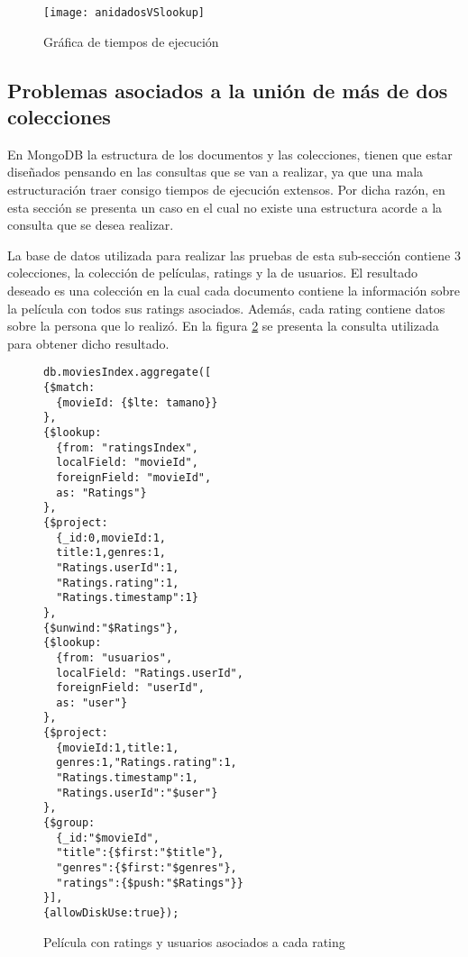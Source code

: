\documentclass[conference,compsoc]{sty/IEEEtran}
\begin{document}
\begin{figure}
\begin{center}
\texttt{[image: anidadosVSlookup]}
\end{center}
\caption{Gráfica de tiempos de ejecución} 
\label{fig:anidados-lookup}
\end{figure}

\subsection{Problemas asociados a la unión de más de dos colecciones}
 En MongoDB la estructura de los documentos y las colecciones, tienen que estar diseñados pensando en las consultas que se van a realizar, ya que una mala estructuración  traer consigo tiempos de ejecución extensos. Por dicha razón, en esta sección se presenta un caso en el cual no existe una estructura acorde a la consulta que se desea realizar. \par

La base de datos utilizada para realizar las pruebas de esta sub-sección contiene 3 colecciones, la colección de películas, ratings y la de usuarios. El resultado deseado es una colección en la cual cada documento contiene la información sobre la película con todos sus ratings asociados. Además, cada rating contiene datos sobre la persona que lo realizó. En la figura \ref{fig:consulta-doubleJoin} se presenta la consulta utilizada para obtener dicho resultado. 

\begin{figure}
    \begin{verbatim}
db.moviesIndex.aggregate([
{$match: 
  {movieId: {$lte: tamano}}
},
{$lookup: 
  {from: "ratingsIndex",
  localField: "movieId",
  foreignField: "movieId",
  as: "Ratings"}
},
{$project:
  {_id:0,movieId:1,
  title:1,genres:1,
  "Ratings.userId":1,
  "Ratings.rating":1,
  "Ratings.timestamp":1}
},
{$unwind:"$Ratings"},
{$lookup: 
  {from: "usuarios",
  localField: "Ratings.userId",
  foreignField: "userId",
  as: "user"}
},
{$project:
  {movieId:1,title:1,
  genres:1,"Ratings.rating":1,
  "Ratings.timestamp":1,
  "Ratings.userId":"$user"}
},
{$group:
  {_id:"$movieId",
  "title":{$first:"$title"},
  "genres":{$first:"$genres"},
  "ratings":{$push:"$Ratings"}}
}],
{allowDiskUse:true});       
\end{verbatim}
\caption{Película con ratings y usuarios asociados a cada rating} 
\label{fig:consulta-doubleJoin}
\end{figure}
\end{document}
